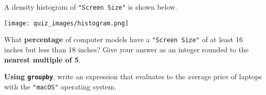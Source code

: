 \documentclass[twoside,12pt]{article}
\begin{document}
\begin{probset}
\begin{prob}






\end{prob}

\begin{prob}

A density histogram of \texttt{"Screen Size"} is shown below.

\vspace{-0.2in}
\begin{minipage}[t]{4.25in}
\noindent 
\begin{center}
    \texttt{[image: quiz\_images/histogram.png]}   
\end{center}
\end{minipage} \hspace{0.25in}
\begin{minipage}[t]{2.25in}
\vspace{0.3in}
\noindent What \textbf{percentage} of computer models have a \texttt{"Screen Size"} of at least 16 inches but less than 18 inches? Give your answer as an integer rounded to the \textbf{nearest multiple of 5}.

\begin{center}
%
\end{center}

\end{minipage}

\end{prob}
\vspace{-0.2in}
\begin{prob}
\vspace{-0.1in}
\begin{subprobset}
\begin{subprob}
\textbf{Using \texttt{groupby}}, write an expression that evaluates to the average price of laptops with the \texttt{"macOS"} operating system.


\end{subprob}
\end{subprobset}
\end{prob}
\end{probset}
\end{document}
